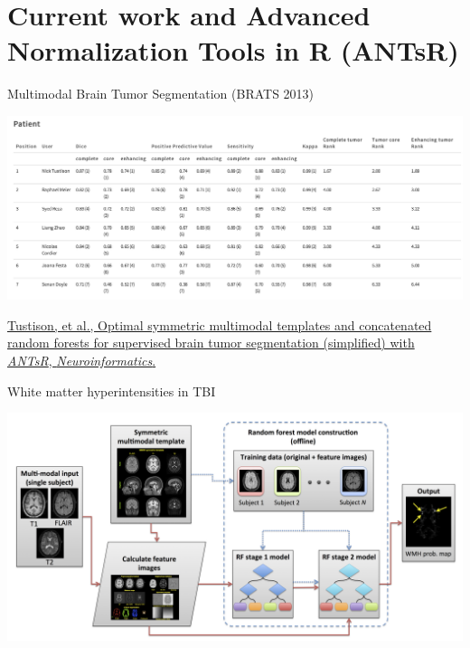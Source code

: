 \documentclass[ignorenonframetext,]{beamer}
\begin{document}
\section{Current work and Advanced Normalization Tools in R
(ANTsR)}\label{current-work-and-advanced-normalization-tools-in-r-antsr}

\begin{frame}{Multimodal Brain Tumor Segmentation (BRATS 2013)}

\includegraphics{./competitions/figures/brats2013results2.png}

\href{http://www.ncbi.nlm.nih.gov/pubmed/25433513}{Tustison, et al.,
Optimal symmetric multimodal templates and concatenated random forests
for supervised brain tumor segmentation (simplified) with \emph{ANTsR},
\emph{Neuroinformatics}.}

\end{frame}

\begin{frame}{White matter hyperintensities in TBI}

\includegraphics{./wmhs/figures/wmhPipeline.png}

\end{frame}
\end{document}
